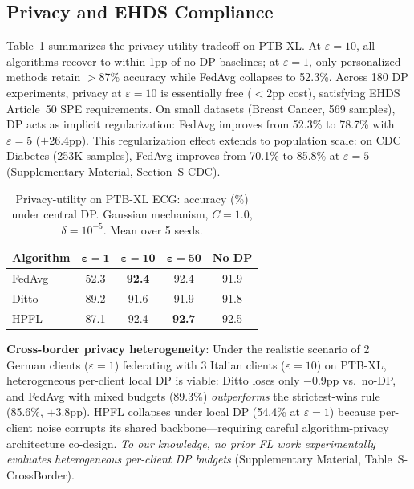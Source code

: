 \documentclass[conference,letterpaper]{IEEEtran}
\begin{document}
\subsection{Privacy and EHDS Compliance}

Table~\ref{tab:dp_mini} summarizes the privacy-utility tradeoff on PTB-XL. At $\varepsilon{=}10$, all algorithms recover to within 1pp of no-DP baselines; at $\varepsilon{=}1$, only personalized methods retain $>$87\% accuracy while FedAvg collapses to 52.3\%. Across 180 DP experiments, privacy at $\varepsilon{=}10$ is essentially free ($<$2pp cost), satisfying EHDS Article~50 SPE requirements. On small datasets (Breast Cancer, 569 samples), DP acts as implicit regularization: FedAvg improves from 52.3\% to 78.7\% with $\varepsilon{=}5$ ($+$26.4pp). This regularization effect extends to population scale: on CDC Diabetes (253K samples), FedAvg improves from 70.1\% to 85.8\% at $\varepsilon{=}5$ (Supplementary Material, Section~S-CDC).

\begin{table}[htbp]
\centering
\caption{Privacy-utility on PTB-XL ECG: accuracy (\%) under central DP. Gaussian mechanism, $C{=}1.0$, $\delta{=}10^{-5}$. Mean over 5 seeds.}
\label{tab:dp_mini}
\small
\begin{tabular}{lcccc}
\toprule
\textbf{Algorithm} & $\boldsymbol{\varepsilon{=}1}$ & $\boldsymbol{\varepsilon{=}10}$ & $\boldsymbol{\varepsilon{=}50}$ & \textbf{No DP} \\
\midrule
FedAvg & 52.3 & \textbf{92.4} & 92.4 & 91.9 \\
Ditto & 89.2 & 91.6 & 91.9 & 91.8 \\
HPFL & 87.1 & 92.4 & \textbf{92.7} & 92.5 \\
\bottomrule
\end{tabular}
\end{table}

\textbf{Cross-border privacy heterogeneity}: Under the realistic scenario of 2 German clients ($\varepsilon{=}1$) federating with 3 Italian clients ($\varepsilon{=}10$) on PTB-XL, heterogeneous per-client local DP is viable: Ditto loses only $-$0.9pp vs.\ no-DP, and FedAvg with mixed budgets (89.3\%) \textit{outperforms} the strictest-wins rule (85.6\%, $+$3.8pp). HPFL collapses under local DP (54.4\% at $\varepsilon{=}1$) because per-client noise corrupts its shared backbone---requiring careful algorithm-privacy architecture co-design. \textit{To our knowledge, no prior FL work experimentally evaluates heterogeneous per-client DP budgets} (Supplementary Material, Table~S-CrossBorder).
\end{document}
